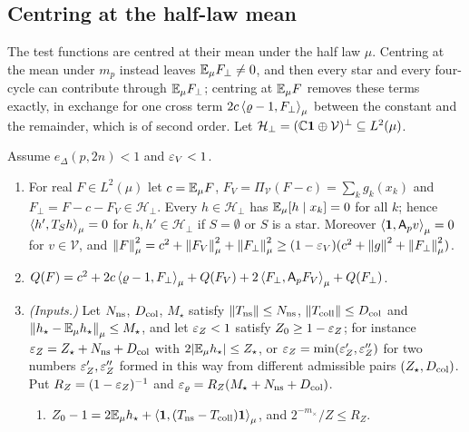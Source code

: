 \subsection{Centring at the half-law mean}\label{subsec:spec:centring}

The test functions are centred at their mean under the half law $\mu$. Centring
at the mean under $m_p$ instead leaves $\mathbb E_\mu F_\perp\ne0$, and then every star and
every four-cycle can contribute through $\mathbb E_\mu F_\perp$; centring at $\mathbb E_\mu F$ removes these terms
exactly, in exchange for one cross term $2c\left\langle \varrho-1,F_\perp\right\rangle_\mu$ between the constant and the remainder,
which is of second order. Let $\mathcal H_\perp=(\mathbb C\mathbf 1\oplus\mathcal V)^\perp\subseteq L^2(\mu)$.

\begin{proposition}\label{prop:spec2:mucentre}
Assume $e_\Delta(p,2n)<1$ and $\varepsilon_V<1$.
\begin{enumerate}[label=\textup{(\alph*)}]
\item\label{it:centre:decomp} For real $F\in L^2(\mu)$ let $c=\mathbb E_\mu F$,
  $F_V=\Pi_{\mathcal V}(F-c)=\sum_kg_k(x_k)$ and $F_\perp=F-c-F_V\in\mathcal H_\perp$. Every
  $h\in\mathcal H_\perp$ has $\mathbb E_\mu[h\mid x_k]=0$ for all $k$; hence $\left\langle h',T_Sh\right\rangle_\mu=0$
  for $h,h'\in\mathcal H_\perp$ if $S=\emptyset$ or $S$ is a star. Moreover
  $\left\langle \mathbf 1,\mathsf A_p v\right\rangle_\mu=0$ for $v\in\mathcal V$, and
  $\left\|F\right\|^2_\mu=c^2+\left\|F_V\right\|^2_\mu+\left\|F_\perp\right\|^2_\mu\ge(1-\varepsilon_V)(c^2+\left\|g\right\|^2+\left\|F_\perp\right\|^2_\mu)$.
\item\label{it:centre:form}
  $Q(F)=c^2+2c\left\langle \varrho-1,F_\perp\right\rangle_\mu+Q(F_V)+2\left\langle F_\perp,\mathsf A_p F_V\right\rangle_\mu+Q(F_\perp)$.
\item\label{it:centre:inputs} \emph{(Inputs.)} Let $N_{\rm ns}$, $D_{\rm col}$, $M_\star$ satisfy
  $\left\|T_{\rm ns}\right\|\le N_{\rm ns}$, $\left\|T_{\rm coll}\right\|\le D_{\rm col}$ and
  $\left\|h_\star-\mathbb E_\mu h_\star\right\|_\mu\le M_\star$, and let $\varepsilon_Z<1$ satisfy $Z_0\ge1-\varepsilon_Z$; for
  instance $\varepsilon_Z=Z_\star+N_{\rm ns}+D_{\rm col}$ with
  $2|\mathbb E_\mu h_\star|\le Z_\star$, or
  $\varepsilon_Z=\min(\varepsilon_Z',\varepsilon_Z'')$ for two numbers
  $\varepsilon_Z',\varepsilon_Z''$ formed in this way from different admissible
  pairs $(Z_\star,D_{\rm col})$.
  Put $R_Z=(1-\varepsilon_Z)^{-1}$ and $\varepsilon_\varrho=R_Z(M_\star+N_{\rm ns}+D_{\rm col})$.
  \begin{enumerate}[label=\textup{(c\arabic*)}]
  \item\label{it:centre:Z} $Z_0-1=2\mathbb E_\mu h_\star+\left\langle \mathbf 1,(T_{\rm ns}-T_{\rm coll})\mathbf 1\right\rangle_\mu$,
    and $2^{-m_\times}/Z\le R_Z$.

\end{enumerate}
\end{enumerate}
\end{proposition}

